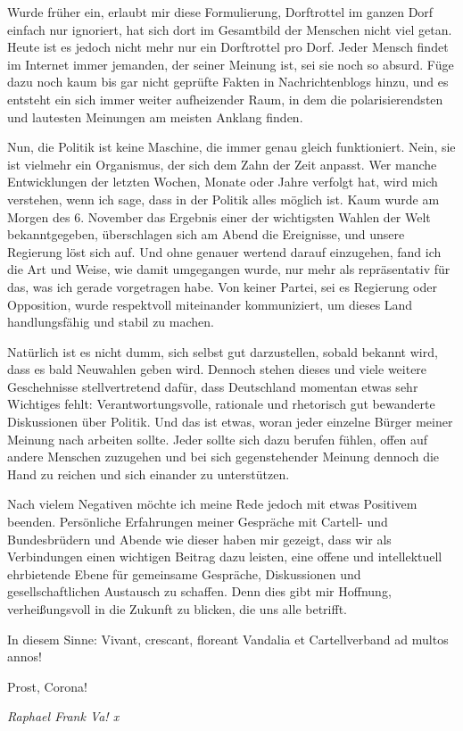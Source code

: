 \begin{multicols}{2}
Wurde früher ein, erlaubt mir diese Formulierung, Dorftrottel im ganzen
Dorf einfach nur ignoriert, hat sich dort im Gesamtbild der Menschen nicht viel
getan. Heute ist es jedoch nicht mehr nur ein Dorftrottel pro Dorf. Jeder
Mensch findet im Internet immer jemanden, der seiner Meinung ist, sei sie noch
so absurd. Füge dazu noch kaum bis gar nicht geprüfte Fakten in
Nachrichtenblogs hinzu, und es entsteht ein sich immer weiter aufheizender
Raum, in dem die polarisierendsten und lautesten Meinungen am meisten Anklang
finden.

Nun, die Politik ist keine Maschine, die
immer genau gleich funktioniert. Nein, sie ist vielmehr ein
Organismus, der sich dem Zahn der Zeit anpasst. Wer manche Entwicklungen der
letzten Wochen, Monate oder Jahre verfolgt hat, wird mich verstehen, wenn ich
sage, dass in der Politik alles möglich ist. Kaum wurde am Morgen des 6.
November das Ergebnis einer der wichtigsten Wahlen der Welt bekanntgegeben,
überschlagen sich am Abend die Ereignisse, und unsere Regierung löst sich auf.
Und ohne genauer wertend darauf einzugehen, fand ich die Art und Weise, wie
damit umgegangen wurde, nur mehr als repräsentativ für das, was ich gerade
vorgetragen habe. Von keiner Partei, sei es Regierung oder Opposition, wurde
respektvoll miteinander kommuniziert, um dieses Land handlungsfähig und stabil
zu machen.

Natürlich ist es nicht dumm, sich selbst gut darzustellen, sobald bekannt
wird, dass es bald Neuwahlen geben wird. Dennoch stehen dieses und viele
weitere Geschehnisse stellvertretend dafür, dass Deutschland momentan etwas
sehr Wichtiges fehlt: Verantwortungsvolle, rationale und rhetorisch gut
bewanderte Diskussionen über Politik. Und das ist etwas, woran jeder einzelne
Bürger meiner Meinung nach arbeiten sollte. Jeder sollte sich dazu berufen
fühlen, offen auf andere Menschen zuzugehen und bei sich gegenstehender Meinung
dennoch die Hand zu reichen und sich einander zu unterstützen.

Nach vielem Negativen möchte ich meine Rede jedoch mit etwas Positivem
beenden. Persönliche Erfahrungen meiner Gespräche mit Cartell- und
Bundesbrüdern und Abende wie dieser haben mir gezeigt, dass wir als
Verbindungen einen wichtigen Beitrag dazu leisten, eine offene und
intellektuell ehrbietende Ebene für gemeinsame Gespräche, Diskussionen und
gesellschaftlichen Austausch zu schaffen. Denn dies gibt mir Hoffnung,
verheißungsvoll in die Zukunft zu blicken, die uns alle betrifft.

In diesem Sinne: Vivant, crescant,
floreant Vandalia et Cartellverband ad multos annos!

Prost, Corona!

	\begin{flushright}
		\hfill\emph{Raphael Frank Va! x}
	\end{flushright}
\end{multicols}

